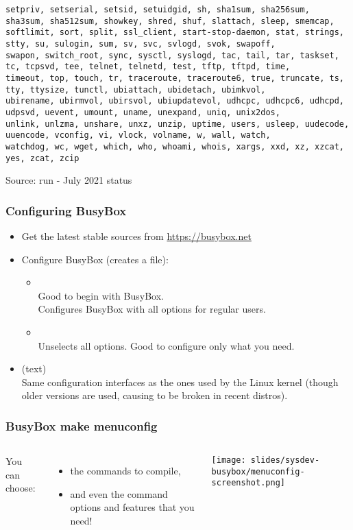 \begin{frame}[fragile]
\begin{verbatim}
setpriv, setserial, setsid, setuidgid, sh, sha1sum, sha256sum, sha3sum, sha512sum, showkey, shred, shuf, slattach, sleep, smemcap,
softlimit, sort, split, ssl_client, start-stop-daemon, stat, strings, stty, su, sulogin, sum, sv, svc, svlogd, svok, swapoff,
swapon, switch_root, sync, sysctl, syslogd, tac, tail, tar, taskset, tc, tcpsvd, tee, telnet, telnetd, test, tftp, tftpd, time,
timeout, top, touch, tr, traceroute, traceroute6, true, truncate, ts, tty, ttysize, tunctl, ubiattach, ubidetach, ubimkvol,
ubirename, ubirmvol, ubirsvol, ubiupdatevol, udhcpc, udhcpc6, udhcpd, udpsvd, uevent, umount, uname, unexpand, uniq, unix2dos,
unlink, unlzma, unshare, unxz, unzip, uptime, users, usleep, uudecode, uuencode, vconfig, vi, vlock, volname, w, wall, watch,
watchdog, wc, wget, which, who, whoami, whois, xargs, xxd, xz, xzcat, yes, zcat, zcip
  \end{verbatim}
  \vfill
  \footnotesize
  Source: run  - July 2021 status
\end{frame}

\begin{frame}
  \frametitle{Configuring BusyBox}
  \begin{itemize}
  \item Get the latest stable sources from \url{https://busybox.net}
  \item Configure BusyBox (creates a  file):
    \begin{itemize}
    \item {}\\
      Good to begin with BusyBox.\\
      Configures BusyBox with all options for regular users.
    \item {}\\
      Unselects all options. Good to configure only what you need.
    \end{itemize}
  \item {} (text)\\
    Same configuration interfaces as the ones used by the Linux kernel
    (though older versions are used, causing  to
    be broken in recent distros).
  \end{itemize}
\end{frame}

\begin{frame}
  \frametitle{BusyBox make menuconfig}
  \begin{columns}[T]
    You can choose:
    \begin{itemize}
    \item the commands to compile,
    \item and even the command options and features that you need!
    \end{itemize}
    \texttt{[image: slides/sysdev-busybox/menuconfig-screenshot.png]}
  \end{columns}
\end{frame}

